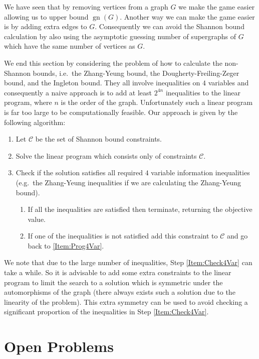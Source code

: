 \documentclass[a4paper, 14pt]{extarticle}
\theoremstyle{plain}
\def\mc{\mathcal}
\DeclareMathOperator{\gn}{gn}
\begin{document}
We have seen that by removing vertices from a graph $G$ we make the
game easier allowing us to upper bound $\gn(G)$. Another way we can
make the game easier is by adding extra edges to $G$. Consequently
we can avoid the Shannon bound calculation by also using the
asymptotic guessing number of supergraphs of $G$ which have the same
number of vertices as $G$.

We end this section by considering the problem of how to calculate
the non-Shannon bounds, i.e.\ the Zhang-Yeung bound, the
Dougherty-Freiling-Zeger bound, and the Ingleton bound. They all
involve inequalities on $4$ variables and consequently a naive
approach is to add at least $2^{4n}$ inequalities to the linear
program, where $n$ is the order of the graph. Unfortunately such a
linear program is far too large to be computationally feasible. Our
approach is given by the following algorithm:
\begin{enumerate}
\item Let $\mc{C}$ be the set of Shannon bound constraints.
\item\label{Item:Prog4Var} Solve the linear program which consists only of constraints
$\mc{C}$.
\item\label{Item:Check4Var} Check if the solution satisfies all required $4$ variable information
inequalities (e.g.\ the Zhang-Yeung inequalities if we are
calculating the Zhang-Yeung bound).
\begin{enumerate}
\item If all the inequalities are satisfied then terminate,
returning the objective value.
\item If one of the inequalities is not satisfied add this
constraint to $\mc{C}$ and go back to \ref{Item:Prog4Var}.
\end{enumerate}
\end{enumerate}

We note that due to the large number of inequalities, Step
\ref{Item:Check4Var} can take a while. So it is advisable to add 
some extra constraints to the linear program to limit the search 
to a solution which is symmetric under the automorphisms of the
graph (there always exists such a solution due to the linearity of
the problem). This extra symmetry can be used to avoid checking a
significant proportion of the inequalities in Step
\ref{Item:Check4Var}.

\section{Open Problems}\label{Sec:Problems}
\end{document}
